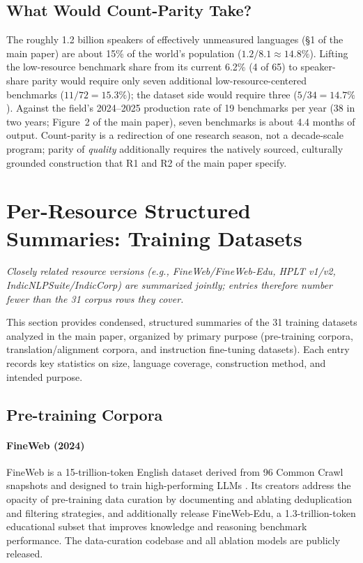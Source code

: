 \documentclass[letterpaper]{article}
\begin{document}
\subsection{What Would Count-Parity Take?}
\label{sec:parity}
The roughly 1.2 billion speakers of effectively unmeasured languages (\S1 of the main paper) are about 15\% of the world's population ($1.2/8.1 \approx 14.8\%$). Lifting the low-resource benchmark share from its current 6.2\% (4 of 65) to speaker-share parity would require only seven additional low-resource-centered benchmarks ($11/72 = 15.3\%$); the dataset side would require three ($5/34 = 14.7\%$). Against the field's 2024--2025 production rate of 19 benchmarks per year (38 in two years; Figure~2 of the main paper), seven benchmarks is about 4.4 months of output. Count-parity is a redirection of one research season, not a decade-scale program; parity of \emph{quality} additionally requires the natively sourced, culturally grounded construction that R1 and R2 of the main paper specify.

\section{Per-Resource Structured Summaries: Training Datasets}
\emph{Closely related resource versions (e.g., FineWeb/FineWeb-Edu, HPLT v1/v2, IndicNLPSuite/IndicCorp) are summarized jointly; entries therefore number fewer than the 31 corpus rows they cover.}

This section provides condensed, structured summaries of the 31 training datasets analyzed in the main paper, organized by primary purpose (pre-training corpora, translation/alignment corpora, and instruction fine-tuning datasets). Each entry records key statistics on size, language coverage, construction method, and intended purpose.

\subsection{Pre-training Corpora}

\paragraph{FineWeb (2024)} FineWeb is a 15-trillion-token English dataset derived from 96 Common Crawl snapshots and designed to train high-performing LLMs \citep{penedo2024finewebdatasetsdecantingweb}. Its creators address the opacity of pre-training data curation by documenting and ablating deduplication and filtering strategies, and additionally release FineWeb-Edu, a 1.3-trillion-token educational subset that improves knowledge and reasoning benchmark performance. The data-curation codebase and all ablation models are publicly released.
\end{document}
